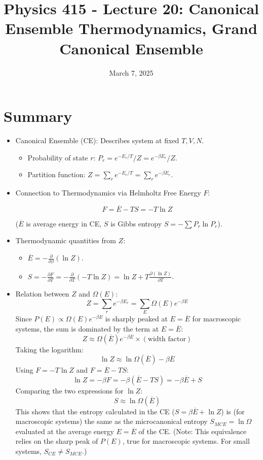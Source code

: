 \documentclass[11pt]{article}
\title{Physics 415 - Lecture 20: Canonical Ensemble Thermodynamics, Grand Canonical Ensemble}
\date{March 7, 2025}
\author{} %
\newcommand{\avg}[1]{\overline{#1}}
\newcommand{\pderiv}[2]{\frac{\partial #1}{\partial #2}}
\newcommand{\partfn}{Z} %
\begin{document}
\maketitle
\thispagestyle{empty}

\section*{Summary}

\begin{itemize}
    \item Canonical Ensemble (CE): Describes system at fixed $T, V, N$.
        \begin{itemize}
            \item Probability of state $r$: $P_r = e^{-E_r/T} / \partfn = e^{-\beta E_r} / \partfn$.
            \item Partition function: $\partfn = \sum_r e^{-E_r/T} = \sum_r e^{-\beta E_r}$.
        \end{itemize}
    \item Connection to Thermodynamics via Helmholtz Free Energy $F$:
        \begin{eqbox}
        \[ F = \avg{E} - TS = -T \ln \partfn \]
        \end{eqbox}
        ($\avg{E}$ is average energy in CE, $S$ is Gibbs entropy $S = -\sum P_r \ln P_r$).
    \item Thermodynamic quantities from $\partfn$:
        \begin{itemize}
            \item $\avg{E} = -\pderiv{}{\beta} (\ln \partfn)$.
            \item $S = -\pderiv{F}{T} = -\pderiv{}{T}(-T \ln \partfn) = \ln \partfn + T \pderiv{(\ln \partfn)}{T}$.
        \end{itemize}
    \item Relation between $Z$ and $\Omega(E)$:
    \[ \partfn = \sum_r e^{-\beta E_r} = \sum_E \Omega(E) e^{-\beta E} \]
    Since $P(E) \propto \Omega(E)e^{-\beta E}$ is sharply peaked at $E = \avg{E}$ for macroscopic systems, the sum is dominated by the term at $E=\avg{E}$:
    \[ \partfn \approx \Omega(\avg{E}) e^{-\beta \avg{E}} \times (\text{width factor}) \]
    Taking the logarithm:
    \[ \ln \partfn \approx \ln \Omega(\avg{E}) - \beta \avg{E} \]
    Using $F = -T \ln \partfn$ and $F = \avg{E} - TS$:
    \[ \ln \partfn = -\beta F = -\beta(\avg{E} - TS) = -\beta \avg{E} + S \]
    Comparing the two expressions for $\ln \partfn$:
    \[ S \approx \ln \Omega(\avg{E}) \]
    This shows that the entropy calculated in the CE ($S = \beta \avg{E} + \ln Z$) is (for macroscopic systems) the same as the microcanonical entropy $S_{MCE} = \ln \Omega$ evaluated at the average energy $E = \avg{E}$ of the CE.
    (Note: This equivalence relies on the sharp peak of $P(E)$, true for macroscopic systems. For small systems, $S_{CE} \neq S_{MCE}$.)
\end{itemize}
\end{document}
